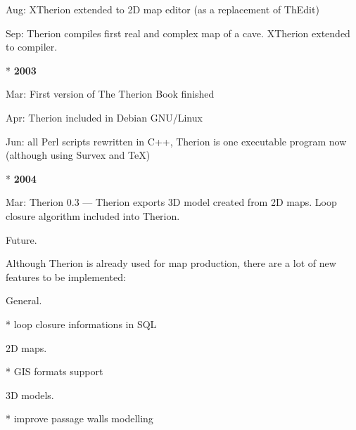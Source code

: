   Aug: XTherion extended to 2D map editor (as a replacement of ThEdit)

  Sep: Therion compiles first real and complex map of a cave. XTherion
       extended to compiler.


* {\bf 2003}\nobreak

  Mar: First version of The Therion Book finished

  Apr: Therion included in Debian GNU/Linux

  Jun: all Perl scripts rewritten in C++, Therion is one executable program
       now (although using Survex and \TeX)
       

* {\bf 2004}\Nobreak

  Mar: Therion 0.3 --- Therion exports 3D model created from 2D maps.
  Loop closure algorithm included into Therion.
\endlist


\subchapter Future.

Although Therion is already used for map production, there are a lot of 
new features to be implemented:

\subsubchapter General.

\list
* loop closure informations in SQL
\endlist

\subsubchapter 2D maps.

\list
* GIS formats support
\endlist


\subsubchapter 3D models.

\list
* improve passage walls modelling
\endlist

\endinput
